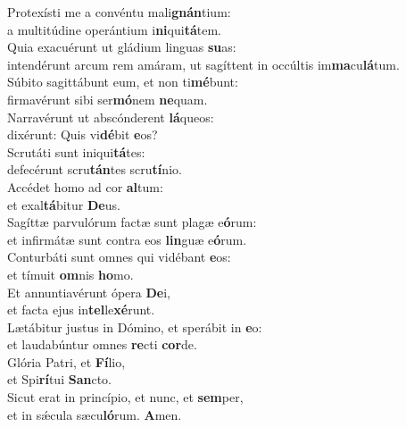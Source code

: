 \evenverse Protexísti me a convéntu mali\textbf{gnán}tium:~\*\\
\evenverse a multitúdine operántium i\textbf{ni}qui\textbf{tá}tem.\\
\oddverse Quia exacuérunt ut gládium linguas \textbf{su}as:~\*\\
\oddverse intendérunt arcum rem amáram, ut sagíttent in occúltis im\textbf{ma}cu\textbf{lá}tum.\\
\evenverse Súbito sagittábunt eum, et non ti\textbf{mé}bunt:~\*\\
\evenverse firmavérunt sibi ser\textbf{mó}nem \textbf{ne}quam.\\
\oddverse Narravérunt ut abscónderent \textbf{lá}queos:~\*\\
\oddverse dixérunt: Quis vi\textbf{dé}bit \textbf{e}os?\\
\evenverse Scrutáti sunt iniqui\textbf{tá}tes:~\*\\
\evenverse defecérunt scru\textbf{tán}tes scru\textbf{tí}nio.\\
\oddverse Accédet homo ad cor \textbf{al}tum:~\*\\
\oddverse et exal\textbf{tá}bitur \textbf{De}us.\\
\evenverse Sagíttæ parvulórum factæ sunt plagæ e\textbf{ó}rum:~\*\\
\evenverse et infirmátæ sunt contra eos \textbf{lin}guæ e\textbf{ó}rum.\\
\oddverse Conturbáti sunt omnes qui vidébant \textbf{e}os:~\*\\
\oddverse et tímuit \textbf{om}nis \textbf{ho}mo.\\
\evenverse Et annuntiavérunt ópera \textbf{De}i,~\*\\
\evenverse et facta ejus in\textbf{tel}le\textbf{xé}runt.\\
\oddverse Lætábitur justus in Dómino, et sperábit in \textbf{e}o:~\*\\
\oddverse et laudabúntur omnes \textbf{re}cti \textbf{cor}de.\\
\evenverse Glória Patri, et \textbf{Fí}lio,~\*\\
\evenverse et Spi\textbf{rí}tui \textbf{San}cto.\\
\oddverse Sicut erat in princípio, et nunc, et \textbf{sem}per,~\*\\
\oddverse et in sǽcula sæcu\textbf{ló}rum. \textbf{A}men.\\
